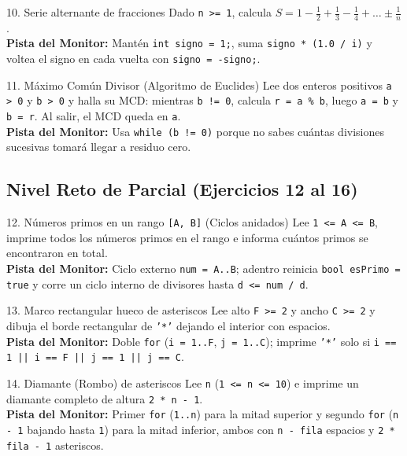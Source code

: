 \documentclass[11pt,letterpaper]{article}
\begin{document}
\begin{ejercicio}{10. Serie alternante de fracciones}
Dado \texttt{n >= 1}, calcula $S = 1 - \frac{1}{2} + \frac{1}{3} - \frac{1}{4} + \dots \pm \frac{1}{n}$.\\
\textbf{Pista del Monitor:} Mantén \texttt{int signo = 1;}, suma \texttt{signo * (1.0 / i)} y voltea el signo en cada vuelta con \texttt{signo = -signo;}.
\end{ejercicio}

\begin{ejercicio}{11. Máximo Común Divisor (Algoritmo de Euclides)}
Lee dos enteros positivos \texttt{a > 0} y \texttt{b > 0} y halla su MCD: mientras \texttt{b != 0}, calcula \texttt{r = a \% b}, luego \texttt{a = b} y \texttt{b = r}. Al salir, el MCD queda en \texttt{a}.\\
\textbf{Pista del Monitor:} Usa \texttt{while (b != 0)} porque no sabes cuántas divisiones sucesivas tomará llegar a residuo cero.
\end{ejercicio}

\subsection{Nivel Reto de Parcial (Ejercicios 12 al 16)}

\begin{ejercicio}{12. Números primos en un rango \texttt{[A, B]} (Ciclos anidados)}
Lee \texttt{1 <= A <= B}, imprime todos los números primos en el rango e informa cuántos primos se encontraron en total.\\
\textbf{Pista del Monitor:} Ciclo externo \texttt{num = A..B}; adentro reinicia \texttt{bool esPrimo = true} y corre un ciclo interno de divisores hasta \texttt{d <= num / d}.
\end{ejercicio}

\begin{ejercicio}{13. Marco rectangular hueco de asteriscos}
Lee alto \texttt{F >= 2} y ancho \texttt{C >= 2} y dibuja el borde rectangular de \texttt{'*'} dejando el interior con espacios.\\
\textbf{Pista del Monitor:} Doble \texttt{for} (\texttt{i = 1..F}, \texttt{j = 1..C}); imprime \texttt{'*'} solo si \texttt{i == 1 || i == F || j == 1 || j == C}.
\end{ejercicio}

\begin{ejercicio}{14. Diamante (Rombo) de asteriscos}
Lee \texttt{n} (\texttt{1 <= n <= 10}) e imprime un diamante completo de altura \texttt{2 * n - 1}.\\
\textbf{Pista del Monitor:} Primer \texttt{for} (\texttt{1..n}) para la mitad superior y segundo \texttt{for} (\texttt{n - 1} bajando hasta \texttt{1}) para la mitad inferior, ambos con \texttt{n - fila} espacios y \texttt{2 * fila - 1} asteriscos.
\end{ejercicio}
\end{document}
